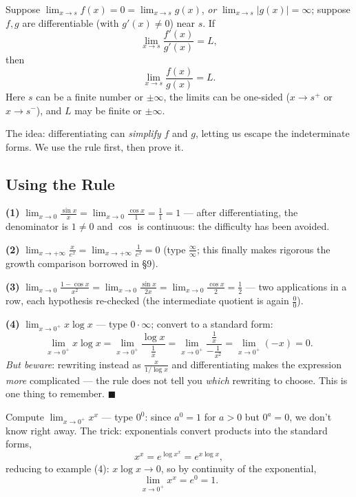 \documentclass[11pt]{report}
\begin{document}
\begin{thmbox}
Suppose $\lim_{x\to s} f(x) = 0 = \lim_{x\to s} g(x)$, \emph{or} $\lim_{x\to s} |g(x)| = \infty$; suppose $f, g$ are differentiable (with $g'(x) \neq 0$) near $s$. If
\[
\lim_{x\to s} \frac{f'(x)}{g'(x)} = L,
\]
then
\[
\lim_{x\to s} \frac{f(x)}{g(x)} = L.
\]
Here $s$ can be a finite number or $\pm\infty$, the limits can be one-sided ($x \to s^+$ or $x \to s^-$), and $L$ may be finite or $\pm\infty$.
\end{thmbox}

The idea: differentiating can \emph{simplify} $f$ and $g$, letting us escape the indeterminate forms. We use the rule first, then prove it.

\subsection{Using the Rule}

\begin{exbox}
\textbf{(1)} $\displaystyle\lim_{x\to0} \frac{\sin x}{x} = \lim_{x\to0} \frac{\cos x}{1} = \frac11 = 1$ --- after differentiating, the denominator is $1 \neq 0$ and $\cos$ is continuous: the difficulty has been avoided.

\textbf{(2)} $\displaystyle\lim_{x\to+\infty} \frac{x}{e^x} = \lim_{x\to+\infty} \frac{1}{e^x} = 0$ (type $\tfrac\infty\infty$; this finally makes rigorous the growth comparison borrowed in \S 9).

\textbf{(3)} $\displaystyle\lim_{x\to0} \frac{1 - \cos x}{x^2} = \lim_{x\to0} \frac{\sin x}{2x} = \lim_{x\to0} \frac{\cos x}{2} = \frac12$ --- two applications in a row, each hypothesis re-checked (the intermediate quotient is again $\tfrac00$).

\textbf{(4)} $\displaystyle\lim_{x\to0^+} x \log x$ --- type $0 \cdot \infty$; convert to a standard form:
\[
\lim_{x\to0^+} x\log x = \lim_{x\to0^+} \frac{\log x}{\tfrac1x} = \lim_{x\to0^+} \frac{\tfrac1x}{-\tfrac1{x^2}} = \lim_{x\to0^+} (-x) = 0.
\]
\emph{But beware}: rewriting instead as $\tfrac{x}{1/\log x}$ and differentiating makes the expression \emph{more} complicated --- the rule does not tell you \emph{which} rewriting to choose. This is one thing to remember. \hfill $\blacksquare$
\end{exbox}

\begin{exbox}
Compute $\lim_{x\to0^+} x^x$ --- type $0^0$: since $a^0 = 1$ for $a > 0$ but $0^a = 0$, we don't know right away. The trick: exponentials convert products into the standard forms,
\[
x^x = e^{\log x^x} = e^{x \log x},
\]
reducing to example (4): $x\log x \to 0$, so by continuity of the exponential,
\[
\lim_{x\to0^+} x^x = e^0 = 1. \tag*{$\blacksquare$}
\]
\end{exbox}
\end{document}
